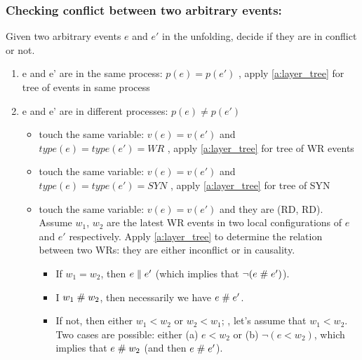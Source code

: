 \documentclass{llncs}
\begin{document}
\subsubsection{Checking conflict between two arbitrary events:}
Given two arbitrary events $e$ and $e'$ in the unfolding, decide if they are in conflict or not.
\begin{enumerate}
	\item e and e' are in the same process: $p(e) = p(e')$ , apply \cref{a:layer_tree} for tree of events in same process
	\item e and e' are in different processes: $p(e)\neq p(e')$
		\begin{itemize}
			\item
				touch the same variable: $v(e) = v(e')$ and $ type(e) = type(e') = WR$ , apply \cref{a:layer_tree} for tree of WR events 
			\item
				touch the same variable: $v(e) = v(e')$ and $ type(e) = type(e') = SYN$ , apply \cref{a:layer_tree} for tree of SYN
			\item
				touch the same variable: $v(e) = v(e')$ and they are (RD, RD). Assume $w_1$, $w_2$ are the latest WR events in two local
				configurations of $e$ and $e'$ respectively. Apply \cref{a:layer_tree} to determine the relation between two WRs: 
				they are either inconflict or in causality.
			\begin{itemize}
				\item
					If $w_1 = w_2$, then $e \mathrel{\parallel} e'$ (which implies that $\lnot (e \mathrel{\#} e')$).
				\item
					I $w_1 \mathrel{\#} w_2$, then necessarily we have $e \mathrel{\#} e'$.
				\item
					If not, then either $w_1 < w_2$ or $w_2 < w_1$; \wlogg, let's assume that $w_1 < w_2$.
					Two cases are possible: either (a) $e < w_2$ or (b) $\lnot (e < w_2)$, which implies that $e \mathrel{\#} w_2$
					(and then $e \mathrel{\#} e'$).
					

\end{itemize}
\end{itemize}
\end{enumerate}
\end{document}
